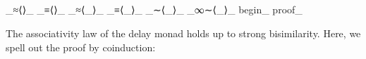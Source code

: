 \documentclass[preliminary,copyright,creativecommons]{eptcs}
\newenvironment{code}{\verbatim}{\endverbatim}
\begin{document}
{\begin{code}
\\
\>  \AgdaSymbol{\{} \AgdaSymbol{:} \AgdaSymbol{\}} \AgdaSymbol{\{} \AgdaSymbol{:} \AgdaSymbol{\}} \<\\
\>[0]\<[2]\>[2]  \AgdaSymbol{(} \AgdaSymbol{(}  \AgdaSymbol{))} \<\\
\>\<\\
\>[2]\<[4]\>[4] \AgdaSymbol{(}\_≈⟨⟩\_  \_≡⟨⟩\_\AgdaSymbol{;} \_≈⟨\_⟩\_  \_≡⟨\_⟩\_\AgdaSymbol{;} \_∼⟨\_⟩\_  \_∞∼⟨\_⟩\_\AgdaSymbol{;} begin\_  proof\_\AgdaSymbol{)}\<\end{code}
}

\noindent
The associativity law of the delay monad holds up to strong
bisimilarity.  Here, we spell out the proof by coinduction:
\end{document}
